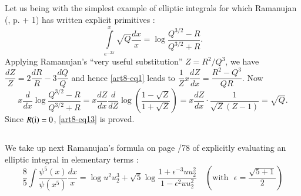 \subsection{}\label{art8-sec2.1}
Let us being with the simplest example of elliptic integrals for which Ramanujan (\cite{art8-key11}, p.  + 1) has written explicit primitives :
\begin{equation}
\int\limits^{x}_{e^{-2\pi}}\sqrt{Q}\dfrac{dx}{x}=\log \frac{Q^{3/2}-R}{Q^{3/2}+R}.\label{art8-eq13}
\end{equation}
Applying Ramanujan's ``very useful substitution'' $Z=R^{2}/Q^{3}$, we have $\dfrac{dZ}{Z}=2\dfrac{dR}{R}-3\dfrac{dQ}{Q}$ and hence \eqref{art8-eq1} leads to $\dfrac{1}{Z}x\dfrac{dZ}{dx}=\dfrac{R^{2}-Q^{3}}{QR}$. Now 
$$
x\dfrac{d}{dx}\log \dfrac{Q^{3/2}-R}{Q^{3/2}+R}=x\dfrac{dZ}{dx}\dfrac{d}{dZ}\log\left(\dfrac{1-\sqrt{Z}}{1+\sqrt{Z}}\right)=x\dfrac{dZ}{dx}\cdot \dfrac{1}{\sqrt{Z}(Z-1)}=\sqrt{Q}.
$$\pageoriginale
Since $R{\rm(i)}=0$, \eqref{art8-eq13} is proved.

\subsection{}\label{art8-sec2.2}
We take up next Ramanujan's formula on page /78 of \cite{art8-key11} explicitly evaluating an elliptic integral in elementary terms :
\begin{equation}
\frac{8}{5}\int \frac{\psi^{5}(x)}{\psi(x^{5})}\dfrac{dx}{x}=\log u^{2}u^{3}_{2}+\sqrt{5}\log \frac{1+\epsilon^{-3}uu^{2}_{2}}{1-\epsilon^{2}uu^{2}_{2}}\quad \left(\text{with~ } \epsilon =\dfrac{\sqrt{5+1}}{2}\right)\label{art8-eq14}
\end{equation}

